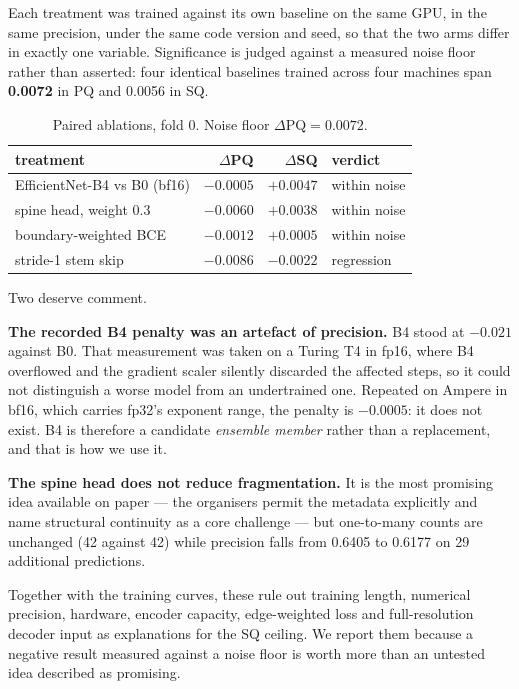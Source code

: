 Each treatment was trained against its own baseline on the same GPU, in the same
precision, under the same code version and seed, so that the two arms differ in
exactly one variable. Significance is judged against a measured noise floor
rather than asserted: four identical baselines trained across four machines span
\textbf{0.0072} in PQ and 0.0056 in SQ.

\begin{table}[t]
\centering
\caption{Paired ablations, fold 0. Noise floor $\Delta\mathrm{PQ} = 0.0072$.}
\begin{tabular}{lrrl}
\toprule
treatment & $\Delta$PQ & $\Delta$SQ & verdict \\
\midrule
EfficientNet-B4 vs B0 (bf16) & $-0.0005$ & $+0.0047$ & within noise \\
spine head, weight 0.3 & $-0.0060$ & $+0.0038$ & within noise \\
boundary-weighted BCE & $-0.0012$ & $+0.0005$ & within noise \\
stride-1 stem skip & $-0.0086$ & $-0.0022$ & regression \\
\bottomrule
\end{tabular}
\end{table}

Two deserve comment.

\textbf{The recorded B4 penalty was an artefact of precision.} B4 stood at
$-0.021$ against B0. That measurement was taken on a Turing T4 in fp16, where B4
overflowed and the gradient scaler silently discarded the affected steps, so it
could not distinguish a worse model from an undertrained one. Repeated on Ampere
in bf16, which carries fp32's exponent range, the penalty is $-0.0005$: it does
not exist. B4 is therefore a candidate \emph{ensemble member} rather than a
replacement, and that is how we use it.

\textbf{The spine head does not reduce fragmentation.} It is the most promising
idea available on paper --- the organisers permit the metadata explicitly and
name structural continuity as a core challenge --- but one-to-many counts are
unchanged (42 against 42) while precision falls from 0.6405 to 0.6177 on 29
additional predictions.

Together with the training curves, these rule out training length, numerical
precision, hardware, encoder capacity, edge-weighted loss and full-resolution
decoder input as explanations for the SQ ceiling. We report them because a
negative result measured against a noise floor is worth more than an untested
idea described as promising.

